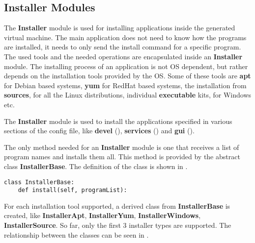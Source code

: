 \subsection{Installer Modules}
\label{sub-sec:installers}

The \textbf{Installer} module is used for installing applications inside the
generated virtual machine. The main application does not need to know how the
programs are installed, it needs to only send the install command for a
specific program. The used tools and the needed operations are encapsulated
inside an \textbf{Installer} module. The installing process of an application
is not OS dependent, but rather depends on the installation tools provided by
the OS. Some of these tools are \textbf{apt} for Debian based systems,
\textbf{yum} for RedHat based systems, the installation from \textbf{sources},
for all the Linux distributions, individual \textbf{executable} kits, for
Windows etc.

The \textbf{Installer} module is used to install the applications specified in
various sections of the config file, like \textbf{devel}
(), \textbf{services}
() and \textbf{gui}
().

The only method needed for an \textbf{Installer} module is one that receives a
list of program names and installs them all. This method is provided by the
abstract class \textbf{InstallerBase}. The definition of the class is shown in
.

\lstset{language=Python,caption=Installer methods,label=lst:installer-methods}
\begin{lstlisting}
class InstallerBase:
	def install(self, programList):
\end{lstlisting}

For each installation tool supported, a
derived class from \textbf{InstallerBase} is created, like
\textbf{InstallerApt}, \textbf{InstallerYum}, \textbf{InstallerWindows},
\textbf{InstallerSource}. So far, only the first 3 installer types are
supported. The relationship between the classes can be seen in
.


